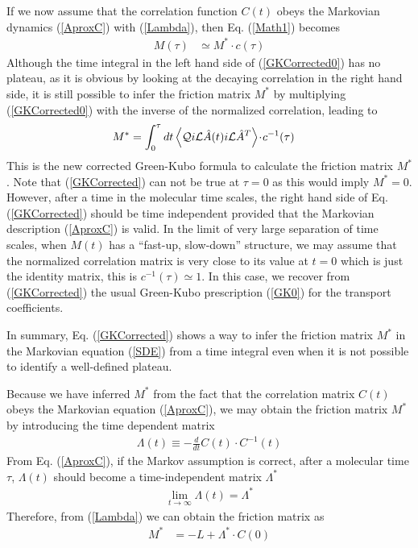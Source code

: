 \documentclass[a4paper,openright,12pt]{book}
\newcommand{\esc}{\!\cdot\!}
\newcommand{\llangle}{\left\langle}
\newcommand{\rrangle}{\right\rangle}
\begin{document}
If  we now  assume  that  the correlation  function  $C(t)$ obeys  the
Markovian   dynamics   (\ref{AproxC})    with   (\ref{Lambda}),   then
Eq. (\ref{Math1}) becomes
\begin{align}
M(\tau)&\simeq M^*\esc c(\tau)
\label{GKCorrected0}
\end{align}
Although   the   time   integral   in    the   left   hand   side   of
(\ref{GKCorrected0}) has  no plateau, as  it is obvious by  looking at
the decaying correlation in the right  hand side, it is still possible
to infer the friction matrix $M^*$ by multiplying (\ref{GKCorrected0})
with the inverse of the normalized correlation, leading to
\begin{align}
M^*&= \int_0^{\tau} dt \llangle {\cal Q} i{\cal L}\hat{A} (t)i{\cal L}\hat{A}^T\rrangle\esc  c^{-1}(\tau)
\label{GKCorrected}
\end{align}
This  is the new  corrected
Green-Kubo  formula  to  calculate  the  friction
matrix $M^*$. Note that (\ref{GKCorrected})  can not  be true at  $\tau=0$ as  this would
imply $M^*=0$.   However, after a  time in the molecular  time scales,
the  right  hand  side  of Eq.   (\ref{GKCorrected})  should  be  time
independent provided that the  Markovian description (\ref{AproxC}) is
valid.  In the limit of very large separation of time scales, when $M(t)$
 has   a  ``fast-up,  slow-down''
structure, we  may assume  that the  normalized correlation  matrix is
very close  to its value at  $t=0$ which is just  the identity matrix,
this  is  $ c^{-1}(\tau)\simeq  1$.  In  this  case, we  recover  from
(\ref{GKCorrected}) the usual  Green-Kubo prescription (\ref{GK0}) for
the transport coefficients.


In summary, Eq. (\ref{GKCorrected}) shows  a way to infer the friction
matrix  $M^*$  in  the  Markovian equation  (\ref{SDE})  from  a  time
integral  even when  it is  not  possible to  identify a  well-defined
plateau.

Because we have inferred $M^*$  from the fact that the  correlation matrix $C(t)$
obeys  the Markovian  equation  (\ref{AproxC}), we may obtain the friction matrix $M^*$
by introducing the time dependent matrix
\begin{align}
\Lambda(t)\equiv-    \frac{d}{dt}C(t)\esc C^{-1}(t)
\label{AproxCtau}
\end{align}
From Eq. (\ref{AproxC}),  if the Markov assumption is  correct, after a
molecular  time   $\tau$,  $\Lambda(t)$  should   become  a
time-independent matrix  $\Lambda^*$
\begin{align}
  \lim_{t\to \infty}\Lambda(t)=\Lambda^*
\label{toLambda*}
\end{align}
Therefore, from (\ref{Lambda}) we can obtain the friction matrix as
\begin{align}
M^*&=  -L+ \Lambda^*\esc C(0)
\label{AproxCtau0}
\end{align}
\end{document}
